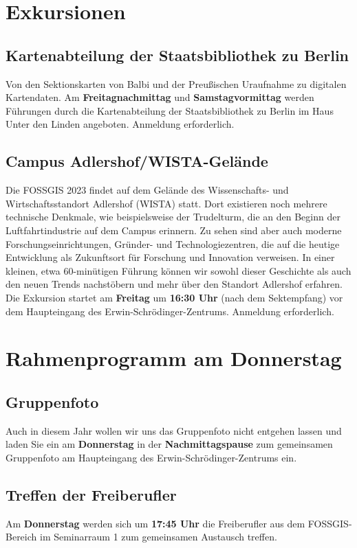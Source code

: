 \section*{Exkursionen}
\subsection*{Kartenabteilung der Staatsbibliothek zu Berlin}
Von den Sektionskarten von Balbi und der Preußischen Uraufnahme zu digitalen Kartendaten.
Am {\bfseries Freitagnachmittag} und {\bfseries Samstagvormittag} werden Führungen durch die Karten\-abteilung der Staatsbibliothek zu Berlin im Haus Unter den Linden angeboten. Anmeldung erforderlich.

\subsection*{Campus Adlershof/WISTA-Gelände}
Die FOSSGIS 2023 findet auf dem Gelände des Wissenschafts- und Wirtschaftsstandort Adlershof (WISTA) statt. Dort existieren noch mehrere technische Denkmale, wie beispielsweise der Trudelturm, die an den Beginn der Luftfahrtindustrie auf dem Campus erinnern. Zu sehen sind aber auch moderne Forschungseinrichtungen, Gründer- und Technologiezentren, die auf die heutige Entwicklung als Zukunftsort für Forschung und Innovation verweisen. In einer kleinen, etwa 60-minütigen Führung können wir sowohl dieser Geschichte als auch den neuen Trends nachstöbern und mehr über den Standort Adlershof erfahren.
Die Exkursion startet am {\bfseries Freitag} um {\bfseries 16:30 Uhr} (nach dem Sektempfang) vor dem Haupteingang des Erwin-Schrödinger-Zentrums. Anmeldung erforderlich.

\section*{Rahmenprogramm am Donnerstag}
\subsection*{Gruppenfoto}
Auch in diesem Jahr wollen wir uns das Gruppenfoto nicht entgehen lassen und laden Sie ein am {\bfseries Donnerstag} in der {\bfseries Nachmittagspause} zum gemeinsamen Gruppenfoto am Haupteingang des Erwin-Schrödinger-Zentrums ein.

\subsection*{Treffen der Freiberufler}
Am {\bfseries Donnerstag} werden sich um {\bfseries 17:45 Uhr} die Freiberufler aus dem FOSSGIS-Bereich im Seminarraum 1 zum gemeinsamen Austausch treffen.


